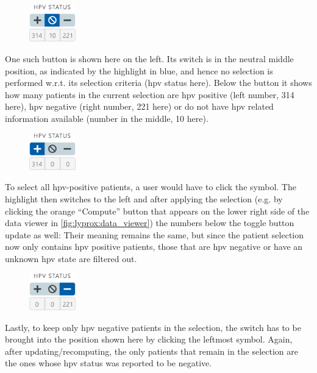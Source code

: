 \documentclass[\relativeRoot/main.tex]{subfiles}
\begin{document}
\begin{samepage}
    \setlength\intextsep{0pt}
    \begin{figure}
        \includegraphics[width=0.18\textwidth]{figures/hpv_neutral.png}
    \end{figure}
    One such button is shown here on the left. Its switch is in the neutral middle  position, as indicated by the highlight in blue, and hence no selection is performed w.r.t. its selection criteria (\gls{hpv} status here). Below the button it shows how many patients in the current selection are \gls{hpv} positive (left number, 314 here), \gls{hpv} negative (right number, 221 here) or do not have \gls{hpv} related information available (number in the middle, 10 here).

    \begin{figure}
        \includegraphics[width=0.18\textwidth]{figures/hpv_positive.png}
    \end{figure}
    To select all \gls{hpv}-positive patients, a user would have to click the  symbol. The highlight then switches to the left and after applying the selection (e.g. by clicking the orange ``Compute'' button that appears on the lower right side of the data viewer in \cref{fig:lyprox:data_viewer}) the numbers below the toggle button update as well: Their meaning remains the same, but since the patient selection now only contains \gls{hpv} positive patients, those that are \gls{hpv} negative or have an unknown \gls{hpv} state are filtered out.

    \begin{figure}
        \includegraphics[width=0.18\textwidth]{figures/hpv_negative.png}
    \end{figure}
    Lastly, to keep only \gls{hpv} negative patients in the selection, the switch has to be brought into the position shown here by clicking the leftmost  symbol. Again, after updating/recomputing, the only patients that remain in the selection are the ones whose \gls{hpv} status was reported to be negative.

    
\end{samepage}
\end{document}

